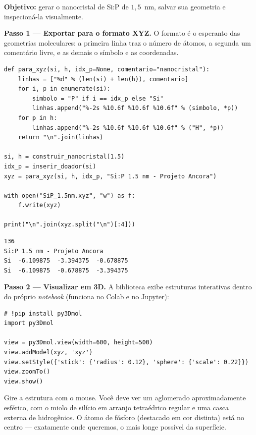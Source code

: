 \begin{caixamaos}
\textbf{Objetivo:} gerar o nanocristal de Si:P de $1{,}5$~nm, salvar sua geometria
e inspecioná-la visualmente.

\vspace{0.4cm}
\textbf{Passo 1 --- Exportar para o formato XYZ.} O formato  é o
esperanto das geometrias moleculares: a primeira linha traz o número de átomos, a
segunda um comentário livre, e as demais o símbolo e as coordenadas.

\begin{lstlisting}[style=python]
def para_xyz(si, h, idx_p=None, comentario="nanocristal"):
    linhas = ["%d" % (len(si) + len(h)), comentario]
    for i, p in enumerate(si):
        simbolo = "P" if i == idx_p else "Si"
        linhas.append("%-2s %10.6f %10.6f %10.6f" % (simbolo, *p))
    for p in h:
        linhas.append("%-2s %10.6f %10.6f %10.6f" % ("H", *p))
    return "\n".join(linhas)

si, h = construir_nanocristal(1.5)
idx_p = inserir_doador(si)
xyz = para_xyz(si, h, idx_p, "Si:P 1.5 nm - Projeto Ancora")

with open("SiP_1.5nm.xyz", "w") as f:
    f.write(xyz)

print("\n".join(xyz.split("\n")[:4]))
\end{lstlisting}

\begin{lstlisting}[style=console]
136
Si:P 1.5 nm - Projeto Ancora
Si  -6.109875  -3.394375  -0.678875
Si  -6.109875  -0.678875  -3.394375
\end{lstlisting}

\vspace{0.3cm}
\textbf{Passo 2 --- Visualizar em 3D.} A biblioteca  exibe estruturas
interativas dentro do próprio \emph{notebook} (funciona no Colab e no Jupyter):

\begin{lstlisting}[style=python]
# !pip install py3Dmol
import py3Dmol

view = py3Dmol.view(width=600, height=500)
view.addModel(xyz, 'xyz')
view.setStyle({'stick': {'radius': 0.12}, 'sphere': {'scale': 0.22}})
view.zoomTo()
view.show()
\end{lstlisting}

Gire a estrutura com o mouse. Você deve ver um aglomerado aproximadamente
esférico, com o miolo de silício em arranjo tetraédrico regular e uma casca
externa de hidrogênios. O átomo de fósforo (destacado em cor distinta) está no
centro --- exatamente onde queremos, o mais longe possível da superfície.


\end{caixamaos}
